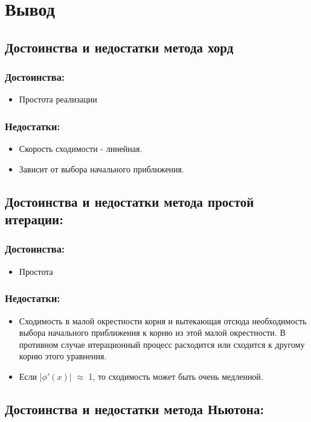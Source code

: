 \section{Вывод}
\subsection{Достоинства и недостатки метода хорд}
\subsubsection{Достоинства:}
\begin{itemize}
    \item Простота реализации
\end{itemize}
\subsubsection{Недостатки:}
\begin{itemize}
    \item Скорость сходимости - линейная.
    \item Зависит от выбора начального приближения.
\end{itemize}

\subsection{Достоинства и недостатки метода простой итерации:}
\subsubsection{Достоинства:}
\begin{itemize}
    \item Простота
\end{itemize}
\subsubsection{Недостатки:}
\begin{itemize}
    \item Сходимость в малой окрестности корня и вытекающая отсюда необходимость выбора начального приближения к корню
    из этой малой окрестности. В противном случае итерационный процесс расходится или сходится к другому корню этого уравнения.
    \item Если |$\phi '(x)$| $\approx$ 1, то сходимость может быть очень медленной.
\end{itemize}
\subsection{Достоинства и недостатки метода Ньютона:}
